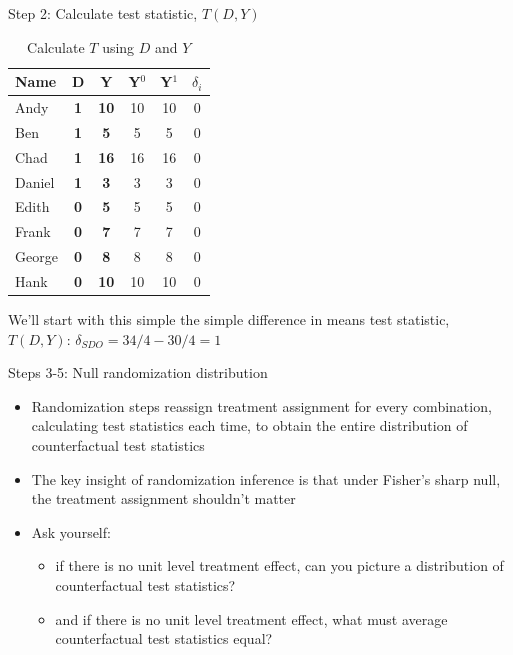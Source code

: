 \documentclass{beamer}
\begin{document}
\begin{frame}{Step 2: Calculate test statistic, $T(D,Y)$}

\begin{table}[htbp]\centering
\begin{center}
\caption{Calculate $T$ using $D$ and $Y$}
\begin{threeparttable}
\begin{tabular}{lccccc}
\toprule
\multicolumn{1}{l}{Name}&
\multicolumn{1}{c}{D}&
\multicolumn{1}{c}{Y}&
\multicolumn{1}{c}{Y$^0$}&
\multicolumn{1}{c}{Y$^1$}&
\multicolumn{1}{c}{$\delta_i$}\\
\midrule
Andy		& \textbf{1} & \textbf{10}  & {10} & {10} & 0\\
Ben		& \textbf{1} & \textbf{5}    & {5} & {5} & 0 \\
Chad	& \textbf{1} & \textbf{16}  & {16} & {16} & 0 \\	
Daniel	& \textbf{1} &  \textbf{3}   & {3} & {3} & 0 \\
Edith		& \textbf{0} & \textbf{5}    & {5} & {5} & 0 \\
Frank	& \textbf{0} & \textbf{7}    & {7} & {7} & 0  \\
George	& \textbf{0} &\textbf {8}    & {8} & {8} & 0 \\
Hank		& \textbf{0} & \textbf{10}  & {10} & {10} & 0 \\
\bottomrule
\end{tabular}
\end{threeparttable}
\end{center}
\end{table}

We'll start with this simple the simple difference in means test statistic, $T(D,Y)$: $\delta_{SDO} = 34/4 - 30/4 = 1$	
\end{frame}



\begin{frame}{Steps 3-5: Null randomization distribution}

\begin{itemize}
\item Randomization steps reassign treatment assignment for every combination, calculating test statistics each time, to obtain the entire distribution of counterfactual test statistics
\item The key insight of randomization inference is that under Fisher's sharp null, the treatment assignment shouldn't matter
\item Ask yourself: 
	\begin{itemize}
	\item if there is no unit level treatment effect, can you picture a distribution of counterfactual test statistics?
	\item and if there is no unit level treatment effect, what must average counterfactual test statistics equal?
	\end{itemize}
\end{itemize}

\end{frame}
\end{document}
